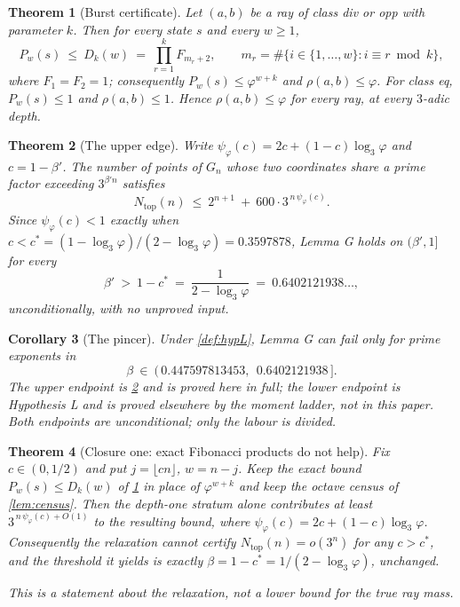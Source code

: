 \documentclass[11pt]{amsart}
\newtheorem{theorem}{Theorem}[section]
\newtheorem{corollary}[theorem]{Corollary}
\theoremstyle{definition}
\theoremstyle{remark}
\begin{document}
\begin{theorem}[Burst certificate]
\label{thm:burst}
Let $(a,b)$ be a ray of class div or opp with parameter $k$. Then for every state $s$ and every $w \ge 1$,
\[
  P_w(s) \ \le \ D_k(w) \ = \ \prod_{r=1}^{k} F_{m_r + 2}, \qquad m_r = \#\{ i \in \{1,\dots,w\} : i \equiv r \bmod k \},
\]
where $F_1 = F_2 = 1$; consequently $P_w(s) \le \varphi^{w+k}$ and $\rho(a,b) \le \varphi$. For class eq, $P_w(s) \le 1$ and $\rho(a,b) \le 1$. Hence $\rho(a,b) \le \varphi$ for every ray, at every $3$-adic depth.
\end{theorem}

\begin{theorem}[The upper edge]
\label{thm:topedge}
Write $\psi_\varphi(c) = 2c + (1-c)\log_3\varphi$ and $c = 1 - \beta'$. The number of points of $G_n$ whose two coordinates share a prime factor exceeding $3^{\beta' n}$ satisfies
\[
  N_{\mathrm{top}}(n) \ \le \ 2^{n+1} \ + \ 600 \cdot 3^{\,n\,\psi_\varphi(c)} .
\]
Since $\psi_\varphi(c) < 1$ exactly when $c < c^* = (1 - \log_3\varphi)/(2 - \log_3\varphi) = 0.3597878$, Lemma G holds on $(\beta', 1]$ for every
\[
  \beta' \ > \ 1 - c^* \ = \ \frac{1}{2 - \log_3\varphi} \ = \ 0.6402121938 \dots ,
\]
unconditionally, with no unproved input.
\end{theorem}

\begin{corollary}[The pincer]
\label{cor:pincer}
Under \cref{def:hypL}, Lemma G can fail only for prime exponents in
\[
  \beta \ \in \ (\,0.447597813453,\ \ 0.6402121938\,] .
\]
The upper endpoint is \cref{thm:topedge} and is proved here in full; the lower endpoint is Hypothesis L and is proved elsewhere by the moment ladder, not in this paper. Both endpoints are unconditional; only the labour is divided.
\end{corollary}

\begin{theorem}[Closure one: exact Fibonacci products do not help]
\label{thm:closure-one}
Fix $c \in (0, 1/2)$ and put $j = \lfloor cn \rfloor$, $w = n - j$. Keep the exact bound $P_w(s) \le D_k(w)$ of \cref{thm:burst} in place of $\varphi^{w+k}$ and keep the octave census of \cref{lem:census}. Then the depth-one stratum alone contributes at least $3^{\,n\,\psi_\varphi(c) + O(1)}$ to the resulting bound, where $\psi_\varphi(c) = 2c + (1-c)\log_3\varphi$. Consequently the relaxation cannot certify $N_{\mathrm{top}}(n) = o(3^n)$ for any $c > c^*$, and the threshold it yields is exactly $\beta = 1 - c^* = 1/(2 - \log_3\varphi)$, unchanged.

This is a statement about the relaxation, not a lower bound for the true ray mass.
\end{theorem}
\end{document}

